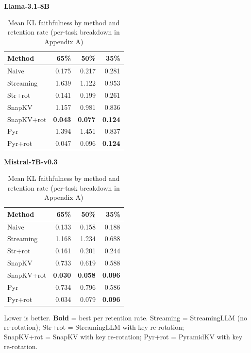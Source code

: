 \documentclass[10pt,letterpaper]{article}
\begin{document}
\begin{table}[H]
\centering
\small
\captionsetup{justification=centering}
\caption{Mean KL faithfulness by method and retention rate (per-task breakdown in Appendix A)}
\label{tab:t3}
\begin{minipage}[t]{0.49\textwidth}
\centering
\textbf{Llama-3.1-8B}\\[0.4em]
\begin{tabular}{@{}lrrr@{}}
\toprule
Method & 65\% & 50\% & 35\%\\
\midrule
Naive      & 0.175 & 0.217 & 0.281\\
Streaming  & 1.639 & 1.122 & 0.953\\
Str+rot    & 0.141 & 0.199 & 0.261\\
SnapKV     & 1.157 & 0.981 & 0.836\\
SnapKV+rot & \textbf{0.043} & \textbf{0.077} & \textbf{0.124}\\
Pyr        & 1.394 & 1.451 & 0.837\\
Pyr+rot    & 0.047 & 0.096 & \textbf{0.124}\\
\bottomrule
\end{tabular}
\end{minipage}%
\hfill
\begin{minipage}[t]{0.49\textwidth}
\centering
\textbf{Mistral-7B-v0.3}\\[0.4em]
\begin{tabular}{@{}lrrr@{}}
\toprule
Method & 65\% & 50\% & 35\%\\
\midrule
Naive      & 0.133 & 0.158 & 0.188\\
Streaming  & 1.168 & 1.234 & 0.688\\
Str+rot    & 0.161 & 0.201 & 0.244\\
SnapKV     & 0.733 & 0.619 & 0.588\\
SnapKV+rot & \textbf{0.030} & \textbf{0.058} & \textbf{0.096}\\
Pyr        & 0.734 & 0.796 & 0.586\\
Pyr+rot    & 0.034 & 0.079 & \textbf{0.096}\\
\bottomrule
\end{tabular}
\end{minipage}
\center Lower is better. \textbf{Bold} = best per retention rate.
Streaming = StreamingLLM (no re-rotation); Str+rot = StreamingLLM with key re-rotation;\\SnapKV+rot = SnapKV with key
re-rotation; Pyr+rot = PyramidKV with key re-rotation.
\end{table}
\end{document}
